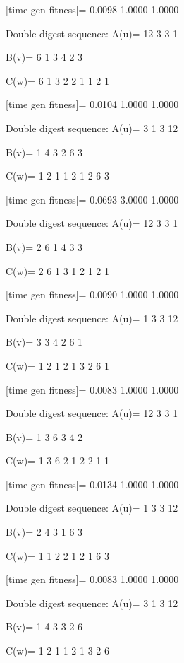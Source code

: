 [time gen fitness]=
    0.0098    1.0000    1.0000

Double digest sequence:
A(u)=
    12     3     3     1

B(v)=
     6     1     3     4     2     3

C(w)=
     6     1     3     2     2     1     1     2     1

[time gen fitness]=
    0.0104    1.0000    1.0000

Double digest sequence:
A(u)=
     3     1     3    12

B(v)=
     1     4     3     2     6     3

C(w)=
     1     2     1     1     2     1     2     6     3

[time gen fitness]=
    0.0693    3.0000    1.0000

Double digest sequence:
A(u)=
    12     3     3     1

B(v)=
     2     6     1     4     3     3

C(w)=
     2     6     1     3     1     2     1     2     1

[time gen fitness]=
    0.0090    1.0000    1.0000

Double digest sequence:
A(u)=
     1     3     3    12

B(v)=
     3     3     4     2     6     1

C(w)=
     1     2     1     2     1     3     2     6     1

[time gen fitness]=
    0.0083    1.0000    1.0000

Double digest sequence:
A(u)=
    12     3     3     1

B(v)=
     1     3     6     3     4     2

C(w)=
     1     3     6     2     1     2     2     1     1

[time gen fitness]=
    0.0134    1.0000    1.0000

Double digest sequence:
A(u)=
     1     3     3    12

B(v)=
     2     4     3     1     6     3

C(w)=
     1     1     2     2     1     2     1     6     3

[time gen fitness]=
    0.0083    1.0000    1.0000

Double digest sequence:
A(u)=
     3     1     3    12

B(v)=
     1     4     3     3     2     6

C(w)=
     1     2     1     1     2     1     3     2     6

